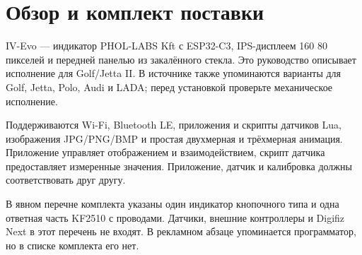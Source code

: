 \chapter{Обзор и комплект поставки}
IV-Evo — индикатор PHOL-LABS Kft с ESP32-C3, IPS-дисплеем 160\,\texttimes\,80 пикселей и передней панелью из закалённого стекла. Это руководство описывает исполнение для Golf/Jetta II. В источнике также упоминаются варианты для Golf, Jetta, Polo, Audi и LADA; перед установкой проверьте механическое исполнение.

Поддерживаются Wi-Fi, Bluetooth LE, приложения и скрипты датчиков Lua, изображения JPG/PNG/BMP и простая двухмерная и трёхмерная анимация. Приложение управляет отображением и взаимодействием, скрипт датчика предоставляет измеренные значения. Приложение, датчик и калибровка должны соответствовать друг другу.

В явном перечне комплекта указаны один индикатор кнопочного типа и одна ответная часть KF2510 с проводами. Датчики, внешние контроллеры и Digifiz Next в этот перечень не входят. В рекламном абзаце упоминается программатор, но в списке комплекта его нет.
